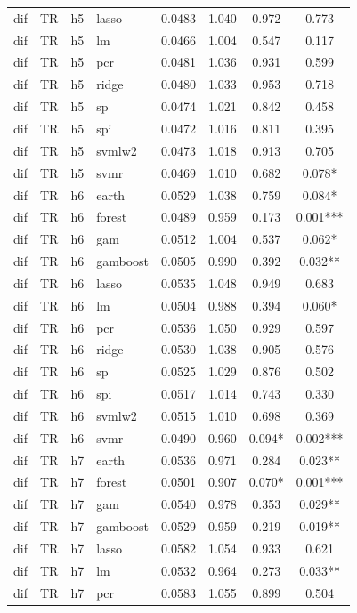 \begin{ThreePartTable}
\begin{longtable}[t]{llclcccc}
dif & TR & h5 & lasso & 0.0483 & 1.040 & 0.972 & 0.773\\
dif & TR & h5 & lm & 0.0466 & 1.004 & 0.547 & 0.117\\
dif & TR & h5 & pcr & 0.0481 & 1.036 & 0.931 & 0.599\\
dif & TR & h5 & ridge & 0.0480 & 1.033 & 0.953 & 0.718\\
dif & TR & h5 & sp & 0.0474 & 1.021 & 0.842 & 0.458\\
dif & TR & h5 & spi & 0.0472 & 1.016 & 0.811 & 0.395\\
dif & TR & h5 & svmlw2 & 0.0473 & 1.018 & 0.913 & 0.705\\
dif & TR & h5 & svmr & 0.0469 & 1.010 & 0.682 & 0.078*\\
\addlinespace
dif & TR & h6 & earth & 0.0529 & 1.038 & 0.759 & 0.084*\\
dif & TR & h6 & forest & 0.0489 & 0.959 & 0.173 & 0.001***\\
dif & TR & h6 & gam & 0.0512 & 1.004 & 0.537 & 0.062*\\
dif & TR & h6 & gamboost & 0.0505 & 0.990 & 0.392 & 0.032**\\
dif & TR & h6 & lasso & 0.0535 & 1.048 & 0.949 & 0.683\\
dif & TR & h6 & lm & 0.0504 & 0.988 & 0.394 & 0.060*\\
dif & TR & h6 & pcr & 0.0536 & 1.050 & 0.929 & 0.597\\
dif & TR & h6 & ridge & 0.0530 & 1.038 & 0.905 & 0.576\\
dif & TR & h6 & sp & 0.0525 & 1.029 & 0.876 & 0.502\\
dif & TR & h6 & spi & 0.0517 & 1.014 & 0.743 & 0.330\\
dif & TR & h6 & svmlw2 & 0.0515 & 1.010 & 0.698 & 0.369\\
dif & TR & h6 & svmr & 0.0490 & 0.960 & 0.094* & 0.002***\\
\addlinespace
dif & TR & h7 & earth & 0.0536 & 0.971 & 0.284 & 0.023**\\
dif & TR & h7 & forest & 0.0501 & 0.907 & 0.070* & 0.001***\\
dif & TR & h7 & gam & 0.0540 & 0.978 & 0.353 & 0.029**\\
dif & TR & h7 & gamboost & 0.0529 & 0.959 & 0.219 & 0.019**\\
dif & TR & h7 & lasso & 0.0582 & 1.054 & 0.933 & 0.621\\
dif & TR & h7 & lm & 0.0532 & 0.964 & 0.273 & 0.033**\\
dif & TR & h7 & pcr & 0.0583 & 1.055 & 0.899 & 0.504\\

\end{longtable}
\end{ThreePartTable}
